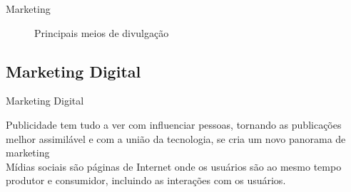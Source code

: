 \documentclass{aula-ifb}
\begin{document}
\begin{frame}{Marketing}
	\begin{figure}[h]
  		\centering
  \quad %
  \quad %
  \quad %
   \caption{Principais meios de divulgação}
	\label{fig1}
\end{figure}
\end{frame}

\subsection{Marketing Digital}
\begin{frame}{Marketing Digital}
\begin{center}
Publicidade tem tudo a ver com influenciar pessoas, tornando as publicações melhor assimilável e com a união da tecnologia, se cria um novo panorama de marketing  \cite{ryan2016}\\
\vspace{20px}
Mídias sociais são páginas de Internet onde os usuários são ao mesmo tempo produtor e consumidor, incluindo as interações com os usuários.  \cite{torres2000} 
\end{center}
\end{frame}
\end{document}
